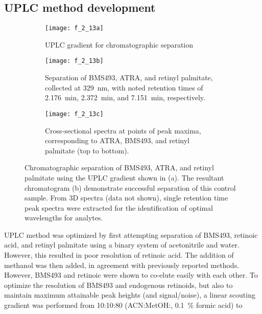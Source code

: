 \begin{refsection}
\section{UPLC method development}
\label{sec:rp_method}
\begin{figure}[h!] \centering \begin{subfigure}[b]{0.7\textwidth}
        \texttt{[image: f\_2\_13a]} \caption{UPLC gradient for
        chromatographic separation} \label{fig:uplc_gradient} \end{subfigure}
    \begin{subfigure}[b]{0.7\textwidth}
        \texttt{[image: f\_2\_13b]} \caption{Separation of BMS493, ATRA, and retinyl palmitate, collected at
            \SI{329}{\nm}, with noted retention times of \SI{2.176}{\minute},
            \SI{2.372}{\minute}, and \SI{7.151}{\minute}, respectively.}
        \label{fig:std_chromatogram} \end{subfigure}
    \begin{subfigure}[b]{0.7\textwidth}
        \texttt{[image: f\_2\_13c]} \caption{Cross-sectional
            spectra
            at points of peak maxima, corresponding to ATRA, BMS493, and retinyl
        palmitate (top to bottom).}
        \label{fig:retinoid_spectra} \end{subfigure}
    \caption[Chromatographic separation of BMS493, ATRA, and retinyl
    palmitate]{Chromatographic separation of BMS493, ATRA, and retinyl palmitate
        using the UPLC gradient shown in (a). The resultant chromatogram (b)
        demonstrate successful separation of this control sample. From 3D
        spectra (data not shown), single retention time peak spectra were
    extracted for the identification of optimal wavelengths for
analytes.}\label{fig:uplc_report} \end{figure}
UPLC method was optimized by first attempting separation of BMS493, retinoic
acid, and retinyl palmitate using a binary system of acetonitrile and water.
However, this resulted in poor resolution of retinoic acid. The addition of
methanol was then added, in agreement with previously reported
methods.\cite{DeLeenheer1982,Kane2008b,Wang2001a,Schaffer2010} However, BMS493
and retinoic were shown to co-elute easily with each other. To optimize the
resolution of BMS493 and endogenous retinoids, but also to maintain maximum
attainable peak heights (and signal/noise), a linear scouting gradient was
performed from 10:10:80 (ACN:MetOH:, \SI{0.1}{\percent} formic acid) to

\end{refsection}
